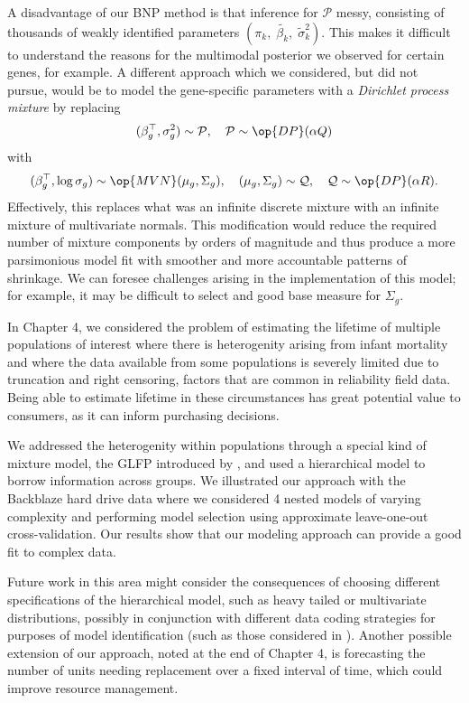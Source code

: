 A disadvantage of our BNP method is that inference for $\mathcal{P}$ messy, consisting of thousands of weakly identified parameters $(\pi_k,\;\tilde{\beta_k},\; \tilde{\sigma}^2_k)$. This makes it difficult to understand the reasons for the multimodal posterior we observed for certain genes, for example. A different approach which we considered, but did not pursue, would be to model the gene-specific parameters with a \textit{Dirichlet process mixture} by replacing
\begin{equation*}
(\beta_g^\top,\sigma^2_g) \sim \mathcal{P},\quad \mathcal{P} \sim \op{DP}(\alpha Q)
\end{equation*}
with
\begin{equation*}
(\beta_g^\top,\log \sigma_g) \sim \op{MVN}(\mu_g, \Sigma_g),\quad (\mu_g,\Sigma_g) \sim \mathcal{Q},\quad \mathcal{Q} \sim \op{DP}(\alpha R).
\end{equation*}
Effectively, this replaces what was an infinite discrete mixture with an infinite mixture of multivariate normals. This modification would reduce the required number of mixture components by orders of magnitude and thus produce a more parsimonious model fit with smoother and more accountable patterns of shrinkage. We can foresee challenges arising in the implementation of this model; for example, it may be difficult to select and good base measure for $\Sigma_g$.

In Chapter 4, we considered the problem of estimating the lifetime of multiple populations of interest where there is heterogenity arising from infant mortality and where the data available from some populations is severely limited due to truncation and right censoring, factors that are common in reliability field data. Being able to estimate lifetime in these circumstances has great potential value to consumers, as it can inform purchasing decisions.

We addressed the heterogenity within populations through a special kind of mixture model, the GLFP introduced by \citet{chan}, and used a hierarchical model to borrow information across groups. We illustrated our approach with the Backblaze hard drive data where we considered 4 nested models of varying complexity and performing model selection using approximate leave-one-out cross-validation. Our results show that our modeling approach can provide a good fit to complex data.

Future work in this area might consider the consequences of choosing different specifications of the hierarchical model, such as heavy tailed or multivariate distributions, possibly in conjunction with different data coding strategies for purposes of model identification (such as those considered in \citet{chan}). Another possible extension of our approach, noted at the end of Chapter 4, is forecasting the number of units needing replacement over a fixed interval of time, which could improve resource management.

